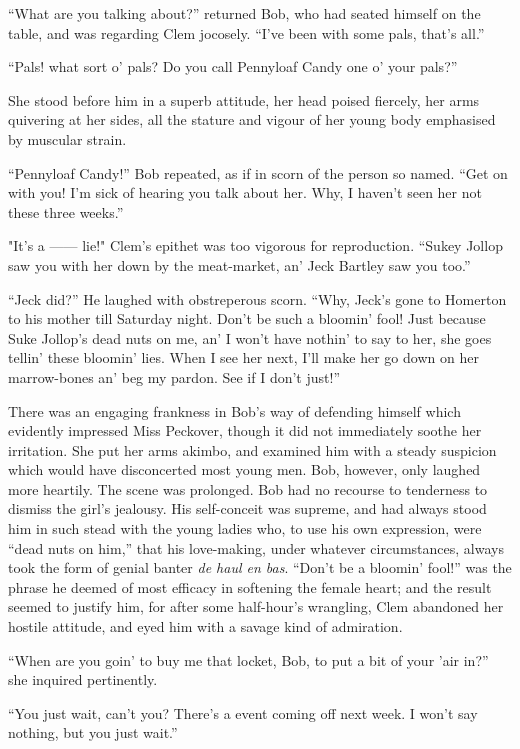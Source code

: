 ``What are you talking about?'' returned Bob, who had seated himself on
the table, and was regarding Clem jocosely. ``I've been with some pals,
that's all.''

``Pals! what sort o' pals? Do you call Pennyloaf Candy one o' your
pals?''

She stood before him in a superb attitude, her head poised fiercely, her
arms quivering at her sides, all the stature and vigour of her young
body emphasised by muscular strain.

``Pennyloaf Candy!'' Bob repeated, as if in scorn of the person so
named. ``Get on with you! I'm sick of hearing you talk about her. Why, I
haven't seen her not these three weeks.''

{\protect\hypertarget{84}{}{}}"It's a {{------}} lie!" Clem's epithet
was too vigorous for reproduction. ``Sukey Jollop saw you with her down
by the meat-market, an' Jeck Bartley saw you too.''

``Jeck did?'' He laughed with obstreperous scorn. ``Why, Jeck's gone to
Homerton to his mother till Saturday night. Don't be such a bloomin'
fool! Just because Suke Jollop's dead nuts on me, an' I won't have
nothin' to say to her, she goes tellin' these bloomin' lies. When I see
her next, I'll make her go down on her marrow-bones an' beg my pardon.
See if I don't just!''

There was an engaging frankness in Bob's way of defending himself which
evidently impressed Miss Peckover, though it did not immediately soothe
her irritation. She put her arms akimbo, and examined him with a steady
suspicion which would have disconcerted most young men. Bob, however,
only laughed more heartily. The scene was prolonged. Bob had no recourse
to tenderness to dismiss the girl's jealousy. His self-conceit was
supreme, and had always stood him {\protect\hypertarget{85}{}{}}in such
stead with the young ladies who, to use his own expression, were ``dead
nuts on him,'' that his love-making, under whatever circumstances,
always took the form of genial banter \emph{de haul en bas}. ``Don't be
a bloomin' fool!'' was the phrase he deemed of most efficacy in
softening the female heart; and the result seemed to justify him, for
after some half-hour's wrangling, Clem abandoned her hostile attitude,
and eyed him with a savage kind of admiration.

``When are you goin' to buy me that locket, Bob, to put a bit of your
'air in?'' she inquired pertinently.

``You just wait, can't you? There's a event coming off next week. I
won't say nothing, but you just wait.''


